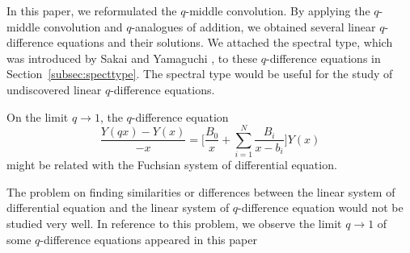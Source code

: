 \documentclass[pdftex]{sigma}
\numberwithin{equation}{section}
\theoremstyle{definition}
\begin{document}
In this paper, we reformulated the $q$-middle convolution.
By applying the $q$-middle convolution and $q$-analogues of addition, we obtained several linear $q$-difference equations and their solutions.
We attached the spectral type, which was introduced by Sakai and Yamaguchi \cite{SY}, to these $q$-difference equations in Section~\ref{subsec:specttype}.
The spectral type would be useful for the study of undiscovered linear $q$-difference equations.

On the limit $q \to 1$, the $q$-difference equation
\begin{equation*}
\frac{Y(q x) - Y(x )}{-x} = \Biggl[ \frac{B_{0}}{x} + \sum^{N}_{i = 1}\frac{B_{i}}{x -b_{i}} \Biggr] Y(x)
\end{equation*}
might be related with the Fuchsian system of differential equation.

The problem on finding similarities or differences between the linear system of differential equation and the linear system of $q$-difference equation would not be studied very well.
In reference to this problem, we observe the limit $q \to 1$ of some $q$-difference equations appeared in this paper
\end{document}
